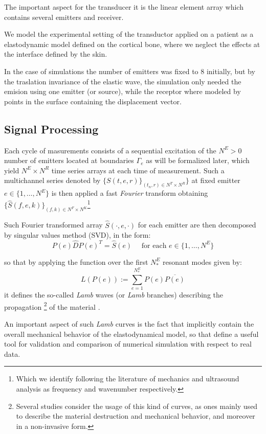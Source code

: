 The important aspect for the transducer it is the linear element array which contains several emitters and receiver. 

We model the experimental setting of the transductor applied on a patient as a elastodynamic model defined on the cortical bone, where we neglect the effects at the interface defined by the skin. 

In the case of simulations the number of emitters was fixed to 8 initially, but by the traslation invariance of the elastic wave, the simulation only needed the emision using one emitter (or source), while the receptor where modeled by points in the surface containing the displacement vector.

\subsection{Signal Processing}
Each cycle of masurements consists of a sequential excitation of the $N^E > 0$ number of emitters located at boundaries $\Gamma_{e}$ as will be formalized later, which yield $N^E \times N^R$ time series arrays at each time of measurement.
Such a multichannel series denoted by $\{ S(t,e,r) \}_{(t_n,r) \in N^T\times N^R}\}$ at fixed emitter $e \in \{1, \dots, N^E\}$ is then applied a fast \textit{Fourier} transform obtaining $\{ \hat{S}(f,e,k) \}_{(f,k) \in N^F\times N^K}$\footnote{Which we identify following the literature of mechanics and ultrasound analysis as frequency and wavenumber respectively.}

Such Fourier transformed array $\hat{S}(\cdot, e, \cdot)$ for each emitter are then decomposed by singular values method (SVD), in the form:
\begin{equation*}
    P(e) \hat{D} P(e)^T = \hat{S}(e) \quad \text{ for each } e \in \{1, \dots, N^E \}
\end{equation*}

so that by applying the function over the first $N^E_*$ resonant modes given by:
\begin{equation*}
    L(P(e)) := \sum \limits_{e = 1}^{N^E_*} P(e) \overline{P(e)}
\end{equation*}
it defines the so-called \textit{Lamb} waves (or \textit{Lamb} branches) describing the propagation \footnote{Several studies consider the usage of this kind of curves, as ones mainly used to describe the material destruction and mechanical behavior, and moreover in a non-invasive form.} of the material \cite{Rhee2007}.

An important aspect of such \textit{Lamb} curves is the fact that implicitly contain the overall mechanical behavior of the elastodynamical model, so that define a useful tool for validation and comparison of numerical simulation with respect to real data. 


